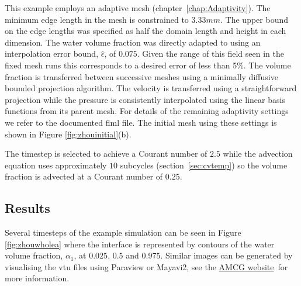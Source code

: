 This example employs an adaptive mesh (chapter~\ref{chap:Adaptivity}). The minimum edge length in the mesh is constrained to $3.33mm$. The upper bound on the edge lengths was specified as half the domain length and height in each dimension.  The water volume fraction was directly adapted to using an interpolation error bound, $\hat{\epsilon}$, of $0.075$. Given the range of this field seen in the fixed mesh runs this corresponds to a desired error of less than 5\%. The volume fraction is transferred between successive meshes using a minimally diffusive bounded projection algorithm.  The velocity is transferred using a straightforward projection while the pressure is consistently interpolated using the linear basis functions from its parent mesh. For details of the remaining adaptivity settings we refer to the documented flml file.  The initial mesh using these settings is shown in Figure \ref{fig:zhouinitial}(b).

The timestep is selected to achieve a Courant number of $2.5$ while the advection equation uses approximately $10$ subcycles
(section~\ref{sec:cvtemp}) so the volume fraction is advected at a Courant number of $0.25$.

\subsection{Results}
Several timesteps of the example simulation can be seen in Figure \ref{fig:zhouwholea} where the interface is represented by
contours of the water volume fraction, $\alpha_1$, at $0.025$, $0.5$ and $0.975$.  Similar images can be generated by visualising
the vtu files using Paraview or Mayavi2, see the \href{http://amcg-www.ese.ic.ac.uk/}{AMCG website}\ for more information.

